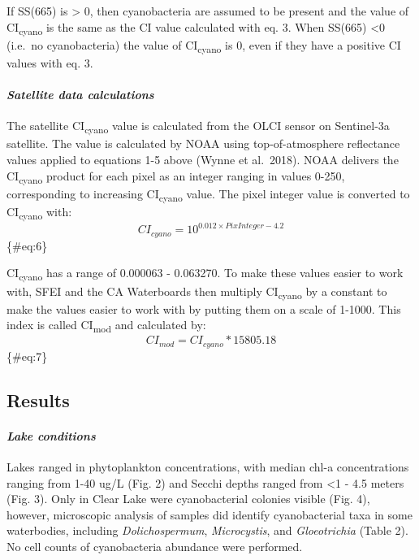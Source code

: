 \documentclass[
]{article}
\begin{document}
If SS(665) is \textgreater{} 0, then cyanobacteria are assumed to be
present and the value of CI\textsubscript{cyano} is the same as the CI
value calculated with eq. 3. When SS(665) \textless0 (i.e.~no
cyanobacteria) the value of CI\textsubscript{cyano} is 0, even if they
have a positive CI values with eq. 3.

\hypertarget{satellite-data-calculations}{%
\paragraph{\texorpdfstring{\emph{Satellite data
calculations}}{Satellite data calculations}}\label{satellite-data-calculations}}

The satellite CI\textsubscript{cyano} value is calculated from the OLCI
sensor on Sentinel-3a satellite. The value is calculated by NOAA using
top-of-atmosphere reflectance values applied to equations 1-5 above
(Wynne et al.~2018). NOAA delivers the CI\textsubscript{cyano} product
for each pixel as an integer ranging in values 0-250, corresponding to
increasing CI\textsubscript{cyano} value. The pixel integer value is
converted to CI\textsubscript{cyano} with: \[
\begin{equation}
CI_{cyano} = 10^{0.012 \times PixInteger - 4.2}
\end{equation}
\] \{\#eq:6\}

CI\textsubscript{cyano} has a range of 0.000063 - 0.063270. To make
these values easier to work with, SFEI and the CA Waterboards then
multiply CI\textsubscript{cyano} by a constant to make the values easier
to work with by putting them on a scale of 1-1000. This index is called
CI\textsubscript{mod} and calculated by: \[
\begin{equation}
CI_{mod} = CI_{cyano} * 15805.18
\end{equation}
\] \{\#eq:7\}

\hypertarget{results}{%
\subsection{\texorpdfstring{\textbf{Results}}{Results}}\label{results}}

\hypertarget{lake-conditions}{%
\paragraph{\texorpdfstring{\emph{Lake
conditions}}{Lake conditions}}\label{lake-conditions}}

Lakes ranged in phytoplankton concentrations, with median chl-a
concentrations ranging from 1-40 ug/L (Fig. 2) and Secchi depths ranged
from \textless1 - 4.5 meters (Fig. 3). Only in Clear Lake were
cyanobacterial colonies visible (Fig. 4), however, microscopic analysis
of samples did identify cyanobacterial taxa in some waterbodies,
including \emph{Dolichospermum}, \emph{Microcystis}, and
\emph{Gloeotrichia} (Table 2). No cell counts of cyanobacteria abundance
were performed.
\end{document}
